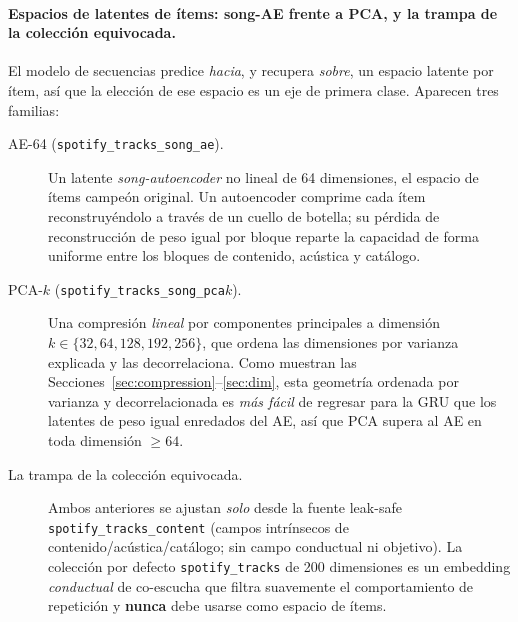 \documentclass[11pt]{article}
\newcommand{\dsid}[1]{\texttt{\small #1}}
\begin{document}
\paragraph{Espacios de latentes de ítems: song-AE frente a PCA, y la trampa de
la colección equivocada.} El modelo de secuencias predice \emph{hacia}, y
recupera \emph{sobre}, un espacio latente por ítem, así que la elección de ese
espacio es un eje de primera clase. Aparecen tres familias:
\begin{description}
  \item[AE-64 (\dsid{spotify\_tracks\_song\_ae}).] Un latente
  \emph{song-autoencoder} no lineal de 64 dimensiones, el espacio de ítems
  campeón original. Un autoencoder comprime cada ítem reconstruyéndolo a través
  de un cuello de botella; su pérdida de reconstrucción de peso igual por bloque
  reparte la capacidad de forma uniforme entre los bloques de contenido,
  acústica y catálogo.
  \item[PCA-$k$ (\dsid{spotify\_tracks\_song\_pca$k$}).] Una compresión
  \emph{lineal} por componentes principales a dimensión $k \in
  \{32,64,128,192,256\}$, que ordena las dimensiones por varianza explicada y
  las decorrelaciona. Como muestran las
  Secciones~\ref{sec:compression}--\ref{sec:dim}, esta geometría ordenada por
  varianza y decorrelacionada es \emph{más fácil} de regresar para la GRU que
  los latentes de peso igual enredados del AE, así que PCA supera al AE en toda
  dimensión $\ge 64$.
  \item[La trampa de la colección equivocada.] Ambos anteriores se ajustan
  \emph{solo} desde la fuente leak-safe \dsid{spotify\_tracks\_content} (campos
  intrínsecos de contenido/acústica/catálogo; sin campo conductual ni objetivo).
  La colección por defecto \dsid{spotify\_tracks} de 200 dimensiones es un
  embedding \emph{conductual} de co-escucha que filtra suavemente el
  comportamiento de repetición y \textbf{nunca} debe usarse como espacio de
  ítems.
\end{description}
\end{document}
